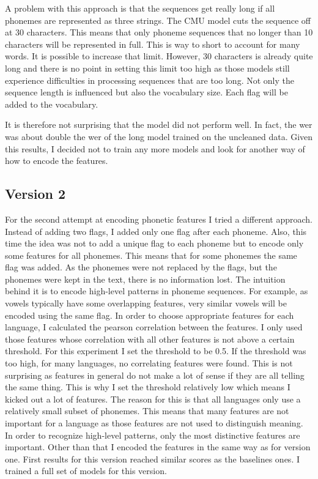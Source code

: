 A problem with this approach is that the sequences get really long if all phonemes are represented as three strings. The CMU model cuts the sequence off at 30 characters. This means that only phoneme sequences that no longer than 10 characters will be represented in full. This is way to short to account for many words. It is possible to increase that limit. However, 30 characters is already quite long and there is no point in setting this limit too high as those models still experience difficulties in processing sequences that are too long. Not only the sequence length is influenced but also the vocabulary size. Each flag will be added to the vocabulary.  

It is therefore not surprising that the model did not perform well. In fact, the \ac{wer} was about double the \ac{wer} of the long model trained on the uncleaned data. Given this results, I decided not to train any more models and look for another way of how to encode the features.

\subsection*{Version 2}
For the second attempt at encoding phonetic features I tried a different approach. Instead of adding two flags, I added only one flag after each phoneme. Also, this time the idea was not to add a unique flag to each phoneme but to encode only some features for all phonemes. This means that for some phonemes the same flag was added. As the phonemes were not replaced by the flags, but the phonemes were kept in the text, there is no information lost. The intuition behind it is to encode high-level patterns in phoneme sequences. For example, as vowels typically have some overlapping features, very similar vowels will be encoded using the same flag. In order to choose appropriate features for each language, I calculated the pearson correlation between the features. I only used those features whose correlation with all other features is not above a certain threshold. For this experiment I set the threshold to be 0.5. If the threshold was too high, for many languages, no correlating features were found. This is not surprising as features in general do not make a lot of sense if they are all telling the same thing. This is why I set the threshold relatively low which means I kicked out a lot of features. 
The reason for this is that all languages only use a relatively small subset of phonemes. This means that many features are not important for a language as those features are not used to distinguish meaning. In order to recognize high-level patterns, only the most distinctive features are important. Other than that I encoded the features in the same way as for version one. First results for this version reached similar scores as the baselines ones. I trained a full set of models for this version.

